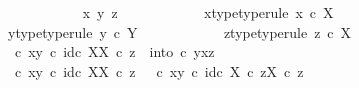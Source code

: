 \begin{isabellebody}
\ \ \ \ \ \ \ \ \ \ \isamarkupfalse%
\ x\ y\ z\isanewline
\ \ \ \ \ \ \ \ \ \ \isamarkupfalse%
\ x{\isacharunderscore}{\kern0pt}type{\isacharbrackleft}{\kern0pt}type{\isacharunderscore}{\kern0pt}rule{\isacharbrackright}{\kern0pt}{\isacharcolon}{\kern0pt}\ {\isachardoublequoteopen}x\ {\isasymin}\isactrlsub c\ X{\isachardoublequoteclose}\isanewline
\ \ \ \ \ \ \ \ \ \ \isamarkupfalse%
\ y{\isacharunderscore}{\kern0pt}type{\isacharbrackleft}{\kern0pt}type{\isacharunderscore}{\kern0pt}rule{\isacharbrackright}{\kern0pt}{\isacharcolon}{\kern0pt}\ {\isachardoublequoteopen}y\ {\isasymin}\isactrlsub c\ Y{\isachardoublequoteclose}\isanewline
\ \ \ \ \ \ \ \ \ \ \isamarkupfalse%
\ z{\isacharunderscore}{\kern0pt}type{\isacharbrackleft}{\kern0pt}type{\isacharunderscore}{\kern0pt}rule{\isacharbrackright}{\kern0pt}{\isacharcolon}{\kern0pt}\ {\isachardoublequoteopen}z\ {\isasymin}\isactrlsub c\ X{\isachardoublequoteclose}\isanewline
\ \ \ \ \ \ \ \ \ \ \isamarkupfalse%
\ {\isachardoublequoteopen}{\isacharparenleft}{\kern0pt}{\isasymTheta}\ {\isasymcirc}\isactrlsub c\ {\isasymlangle}x{\isacharcomma}{\kern0pt}y{\isasymrangle}{\isacharparenright}{\kern0pt}\isactrlsup {\isasymflat}\ {\isasymcirc}\isactrlsub c\ {\isasymlangle}id\isactrlsub c\ X{\isacharcomma}{\kern0pt}{\isasymbeta}\isactrlbsub X\isactrlesub {\isasymrangle}\ {\isasymcirc}\isactrlsub c\ z\ {\isacharequal}{\kern0pt}\ into\ {\isasymcirc}\isactrlsub c\ {\isasymlangle}y{\isacharcomma}{\kern0pt}{\isasymlangle}x{\isacharcomma}{\kern0pt}z{\isasymrangle}{\isasymrangle}{\isachardoublequoteclose}\isanewline
\ \ \ \ \ \ \ \ \ \ \isamarkupfalse%
\ {\isacharminus}{\kern0pt}\ \isanewline
\ \ \ \ \ \ \ \ \ \ \ \ \isamarkupfalse%
\ {\isachardoublequoteopen}{\isacharparenleft}{\kern0pt}{\isasymTheta}\ {\isasymcirc}\isactrlsub c\ {\isasymlangle}x{\isacharcomma}{\kern0pt}y{\isasymrangle}{\isacharparenright}{\kern0pt}\isactrlsup {\isasymflat}\ {\isasymcirc}\isactrlsub c\ {\isasymlangle}id\isactrlsub c\ X{\isacharcomma}{\kern0pt}{\isasymbeta}\isactrlbsub X\isactrlesub {\isasymrangle}\ {\isasymcirc}\isactrlsub c\ z\ {\isacharequal}{\kern0pt}\ {\isacharparenleft}{\kern0pt}{\isasymTheta}\ {\isasymcirc}\isactrlsub c\ {\isasymlangle}x{\isacharcomma}{\kern0pt}y{\isasymrangle}{\isacharparenright}{\kern0pt}\isactrlsup {\isasymflat}\ {\isasymcirc}\isactrlsub c\ {\isasymlangle}id\isactrlsub c\ X\ {\isasymcirc}\isactrlsub c\ z{\isacharcomma}{\kern0pt}{\isasymbeta}\isactrlbsub X\isactrlesub \ {\isasymcirc}\isactrlsub c\ z{\isasymrangle}{\isachardoublequoteclose}\isanewline

\end{isabellebody}
